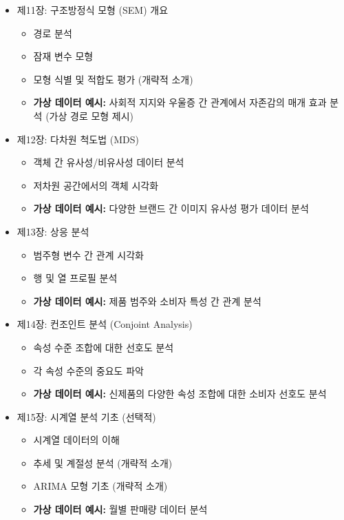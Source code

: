 \documentclass[
  letterpaper,
]{book}
\providecommand{\tightlist}{%
  \setlength{\itemsep}{0pt}\setlength{\parskip}{0pt}}
\begin{document}
\begin{itemize}
\tightlist
\item
  제11장: 구조방정식 모형 (SEM) 개요

  \begin{itemize}
  \tightlist
  \item
    경로 분석
  \item
    잠재 변수 모형
  \item
    모형 식별 및 적합도 평가 (개략적 소개)
  \item
    \textbf{가상 데이터 예시:} 사회적 지지와 우울증 간 관계에서 자존감의
    매개 효과 분석 (가상 경로 모형 제시)
  \end{itemize}
\item
  제12장: 다차원 척도법 (MDS)

  \begin{itemize}
  \tightlist
  \item
    객체 간 유사성/비유사성 데이터 분석
  \item
    저차원 공간에서의 객체 시각화
  \item
    \textbf{가상 데이터 예시:} 다양한 브랜드 간 이미지 유사성 평가
    데이터 분석
  \end{itemize}
\item
  제13장: 상응 분석

  \begin{itemize}
  \tightlist
  \item
    범주형 변수 간 관계 시각화
  \item
    행 및 열 프로필 분석
  \item
    \textbf{가상 데이터 예시:} 제품 범주와 소비자 특성 간 관계 분석
  \end{itemize}
\item
  제14장: 컨조인트 분석 (Conjoint Analysis)

  \begin{itemize}
  \tightlist
  \item
    속성 수준 조합에 대한 선호도 분석
  \item
    각 속성 수준의 중요도 파악
  \item
    \textbf{가상 데이터 예시:} 신제품의 다양한 속성 조합에 대한 소비자
    선호도 분석
  \end{itemize}
\item
  제15장: 시계열 분석 기초 (선택적)

  \begin{itemize}
  \tightlist
  \item
    시계열 데이터의 이해
  \item
    추세 및 계절성 분석 (개략적 소개)
  \item
    ARIMA 모형 기초 (개략적 소개)
  \item
    \textbf{가상 데이터 예시:} 월별 판매량 데이터 분석
  \end{itemize}
\end{itemize}
\end{document}
